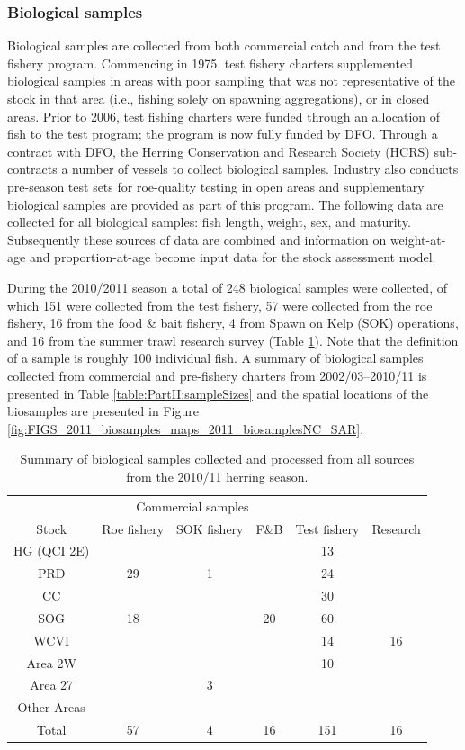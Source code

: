 	\subsubsection{Biological samples}
	
	Biological samples are collected from both commercial catch and from the test fishery program.  Commencing  in 1975, test fishery charters supplemented biological samples in areas with poor sampling that was not representative of the stock in that area (i.e., fishing solely on spawning aggregations), or in closed areas. Prior to 2006, test fishing charters were funded through an allocation of fish to the test program; the program is now fully funded by DFO.  Through a contract with DFO, the Herring Conservation and Research Society (HCRS) sub-contracts a number of vessels to collect biological samples.  Industry also conducts pre-season test sets for roe-quality testing in open areas and supplementary biological samples are provided as part of this program.  The following data are collected for all biological samples: fish length, weight, sex, and maturity.  Subsequently these sources of data are combined and information on weight-at-age and proportion-at-age become input data for the stock assessment model.
	
	During the 2010/2011 season a total of 248 biological samples were collected, of which 151 were collected from the test fishery, 57 were collected from the roe fishery, 16 from the food \& bait fishery, 4 from Spawn on Kelp (SOK) operations, and 16 from the summer trawl research survey (Table \ref{table:PartII:bioSamples}).  Note that the definition of a sample is roughly 100 individual fish.  A summary of biological samples collected from commercial and pre-fishery charters from 2002/03--2010/11 is presented in Table \ref{table:PartII:sampleSizes} and the spatial locations of the biosamples are presented in Figure \ref{fig:FIGS_2011_biosamples_maps_2011_biosamplesNC_SAR}.

\begin{table}
	\caption{Summary of biological samples collected and processed from all sources from the 2010/11 herring season.}
	\label{table:PartII:bioSamples}
	\begin{center}
		\begin{tabular}{cccccc}
		\hline
		& \multicolumn{3}{c}{Commercial samples} &  \\
		Stock & Roe fishery & SOK fishery & F\&B & Test fishery & Research\\
		\hline
		HG (QCI 2E) &  &  &  & 13\\
		PRD & 29 & 1 &  & 24\\
		CC &  &  &  & 30\\
		SOG & 18 &  & 20 & 60\\
		WCVI &  &  &  & 14 & 16\\
		Area 2W &  &  &  & 10\\
		Area 27 &  & 3\\
		Other Areas\\
		\hline
		Total & 57 & 4 & 16 & 151 & 16\\
		\hline
		\end{tabular}
	\end{center}
\end{table}

